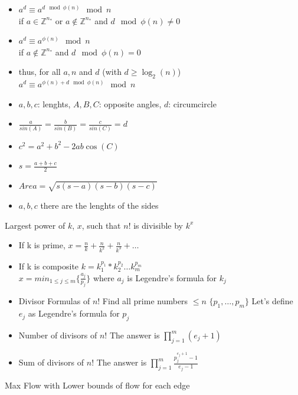 \begin{itemize}
\item $a^{d} \equiv a^{d \mod \phi(n)} \mod n$ \\
      if $a \in \mathbb{Z}^{n_{*}}$ or $a \notin \mathbb{Z}^{n_{*}}$ and $d \mod \phi(n) \neq 0$
\item $a^{d} \equiv a^{\phi(n)} \mod n$ \\
      if $a \notin \mathbb{Z}^{n_{*}}$ and $d \mod \phi(n) = 0$
\item thus, for all $a, n$ and $d$ (with $d \geq \log_2(n)$) \\
      $a^{d} \equiv a^{\phi(n) + d \mod \phi(n)} \mod n$
\end{itemize}
\begin{itemize}
\item $a, b, c$: lenghts, $A, B, C$: opposite angles, $d$: circumcircle
\item $\frac{a}{sin(A)} = \frac{b}{sin(B)} = \frac{c}{sin(C)} = d$
\item $c^2 = a^2 + b^2 - 2ab\cos(C)$
\end{itemize}
\begin{itemize}
\item $s = \frac{a+b+c}{2}$
\item $Area = \sqrt{s(s-a)(s-b)(s-c)}$
\item $a, b, c$ there are the lenghts of the sides
\end{itemize}
 Largest power of $k$, $x$, such that $n!$ is divisible by $k^x$
\begin{itemize}
\item If k is prime, $x = \frac{n}{k} + \frac{n}{k^2} +\frac{n}{k^3}+ \dots $
\item If k is composite $k =  k_1^{p_1}* k_2^{p_2}\dots k_m^{p_m} $ \\
	$ x = min_{1\leq j\leq m}\{ \frac{a_j}{p_j} \}$ where $a_j$ is Legendre's formula for $k_j$
\item Divisor Formulas of $n!$ Find all prime numbers $\leq n$ $\{ p_1, \dots, p_m \}$ Let's define $e_j$ as Legendre's formula for $p_j$
\item Number of divisors of $n!$ The answer is $\prod_{j=1}^m (e_j +1)$
\item Sum of divisors of $n!$ The answer is  $\prod_{j=1}^m \frac{p_j^{e_j+1}-1}{e_j-1}$  \\
\end{itemize}
 Max Flow with Lower bounds of flow for each edge
